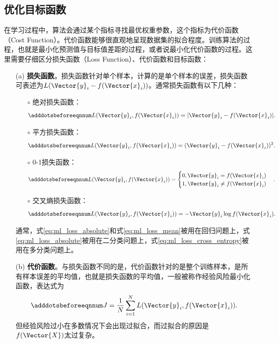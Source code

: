 \subsection{优化目标函数}\label{sec:ml_loss}

在学习过程中，算法会通过某个指标寻找最优权重参数，这个指标为代价函数（Cost Function）。代价函数能够很直观地呈现数据集的拟合程度。训练算法的过程，也就是最小化预测值与目标值差距的过程，或者说最小化代价函数的过程。这里需要仔细区分损失函数（Loss Function）、代价函数和目标函数：
\begin{itemize}
  \item[(a)] \textbf{损失函数}。损失函数针对单个样本，计算的是单个样本的误差，损失函数可表述为$L(\Vector{y}_i-f(\Vector{x}_i))$。通常损失函数有以下几种：
  \begin{enumerate}
    \item[$\circ$] 绝对损失函数：
    \begin{equation}\adddotsbeforeeqnnum
      \label{eq:ml_loss_absolute}
      L(\Vector{y}_i,f(\Vector{x}_i))=|\Vector{y}_i-f(\Vector{x}_i)|.
    \end{equation}
    \item[$\circ$] 平方损失函数：
    \begin{equation}\adddotsbeforeeqnnum
      \label{eq:ml_loss_mean}
      L(\Vector{y}_i,f(\Vector{x}_i))=(\Vector{y}_i-f(\Vector{x}_i))^2.
    \end{equation}
    \item[$\circ$] 0-1损失函数：
    \begin{equation}\adddotsbeforeeqnnum
      \label{eq:ml_loss_01}
      L(\Vector{y}_i,f(\Vector{x}_i))=
      \begin{cases}
        0, \Vector{y}_i=f(\Vector{x}_i)\\
        1, \Vector{y}_i\neq f(\Vector{x}_i)
      \end{cases}.
    \end{equation}
    \item[$\circ$] 交叉熵损失函数：
    \begin{equation}\adddotsbeforeeqnnum
      \label{eq:ml_loss_cross_entropy}
      L(\Vector{y}_i,f(\Vector{x}_i))=-\Vector{y}_i\log f(\Vector{x}_i).
    \end{equation}
  \end{enumerate}
  通常，式\ref{eq:ml_loss_absolute}和式\ref{eq:ml_loss_mean}被用在回归问题上，式\ref{eq:ml_loss_absolute}被用在二分类问题上，式\ref{eq:ml_loss_cross_entropy}被用在多分类问题上。

  \item[(b)] \textbf{代价函数}。与损失函数不同的是，代价函数针对的是整个训练样本，是所有样本误差的平均值，也就是损失函数的平均值，一般被称作经验风险最小化函数，表达式为
  \begin{equation}\adddotsbeforeeqnnum
    \label{eq:ml_loss_experience}
    J=\frac{1}{N}\sum_{i=1}^{N}L(\Vector{y}_i,f(\Vector{x}_i)).
  \end{equation}
  但经验风险过小在多数情况下会出现过拟合，而过拟合的原因是$f(\Vector{X})$太过复杂。


\end{itemize}
